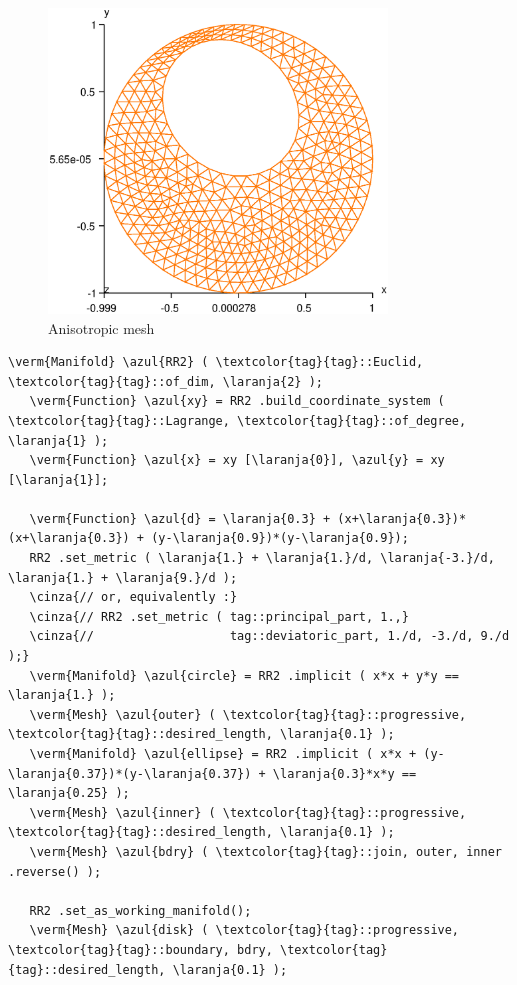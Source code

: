 \begin{figure} \centering
 \includegraphics[width=90mm]{disk-anisotrop}
  \caption{Anisotropic mesh}
  \label{\numb section 3.\numb fig 12}
\end{figure}

\begin{Verbatim}[commandchars=\\\{\},formatcom=\small\tt,frame=single,
   label=code not working,rulecolor=\color{coment},
   baselinestretch=0.94,framesep=2mm                                  ]
   \verm{Manifold} \azul{RR2} ( \textcolor{tag}{tag}::Euclid, \textcolor{tag}{tag}::of_dim, \laranja{2} );
   \verm{Function} \azul{xy} = RR2 .build_coordinate_system ( \textcolor{tag}{tag}::Lagrange, \textcolor{tag}{tag}::of_degree, \laranja{1} );
   \verm{Function} \azul{x} = xy [\laranja{0}], \azul{y} = xy [\laranja{1}];

   \verm{Function} \azul{d} = \laranja{0.3} + (x+\laranja{0.3})*(x+\laranja{0.3}) + (y-\laranja{0.9})*(y-\laranja{0.9});
   RR2 .set_metric ( \laranja{1.} + \laranja{1.}/d, \laranja{-3.}/d, \laranja{1.} + \laranja{9.}/d );
   \cinza{// or, equivalently :}
   \cinza{// RR2 .set_metric ( tag::principal_part, 1.,}
   \cinza{//                   tag::deviatoric_part, 1./d, -3./d, 9./d );}
   \verm{Manifold} \azul{circle} = RR2 .implicit ( x*x + y*y == \laranja{1.} );
   \verm{Mesh} \azul{outer} ( \textcolor{tag}{tag}::progressive, \textcolor{tag}{tag}::desired_length, \laranja{0.1} );
   \verm{Manifold} \azul{ellipse} = RR2 .implicit ( x*x + (y-\laranja{0.37})*(y-\laranja{0.37}) + \laranja{0.3}*x*y == \laranja{0.25} );
   \verm{Mesh} \azul{inner} ( \textcolor{tag}{tag}::progressive, \textcolor{tag}{tag}::desired_length, \laranja{0.1} );
   \verm{Mesh} \azul{bdry} ( \textcolor{tag}{tag}::join, outer, inner .reverse() );

   RR2 .set_as_working_manifold();
   \verm{Mesh} \azul{disk} ( \textcolor{tag}{tag}::progressive, \textcolor{tag}{tag}::boundary, bdry, \textcolor{tag}{tag}::desired_length, \laranja{0.1} );
\end{Verbatim}

